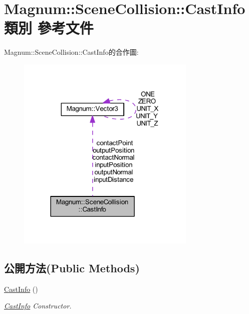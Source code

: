\hypertarget{class_magnum_1_1_scene_collision_1_1_cast_info}{}\section{Magnum\+:\+:Scene\+Collision\+:\+:Cast\+Info 類別 參考文件}
\label{class_magnum_1_1_scene_collision_1_1_cast_info}


Magnum\+:\+:Scene\+Collision\+:\+:Cast\+Info的合作圖\+:\nopagebreak
\begin{figure}[H]
\begin{center}
\leavevmode
\includegraphics[width=242pt]{class_magnum_1_1_scene_collision_1_1_cast_info__coll__graph}
\end{center}
\end{figure}
\subsection*{公開方法(Public Methods)}
\begin{DoxyCompactItemize}
\item 
\hyperlink{class_magnum_1_1_scene_collision_1_1_cast_info_a9f204660765b8b7f0e8035dd31649668}{Cast\+Info} ()
\begin{DoxyCompactList}\small\item\em \hyperlink{class_magnum_1_1_scene_collision_1_1_cast_info}{Cast\+Info} Constructor. \end{DoxyCompactList}\end{DoxyCompactItemize}
